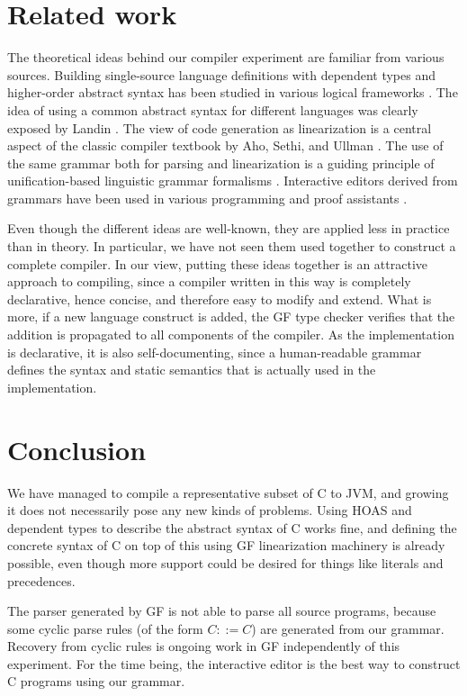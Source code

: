 \documentclass[12pt]{article}
\begin{document}
\section{Related work}

The theoretical ideas behind our compiler experiment
are familiar from various sources.
Building single-source language definitions with
dependent types and higher-order abstract syntax
has been studied in various logical frameworks 
\cite{harper-honsell,magnusson-nordstr,twelf}.
The idea of using a common abstract syntax for different 
languages was clearly exposed by Landin \cite{landin}. The view of
code generation as linearization is a central aspect of
the classic compiler textbook by Aho, Sethi, and Ullman
\cite{aho-ullman}. 
The use of the same grammar both for parsing and linearization
is a guiding principle of unification-based linguistic grammar 
formalisms \cite{pereira-shieber}. Interactive editors derived from
grammars have been used in various programming and proof
assistants \cite{teitelbaum,metal,magnusson-nordstr}.

Even though the different ideas are well-known, they are
applied less in practice than in theory. In particular,
we have not seen them used together to construct a complete
compiler. In our view, putting these ideas together is
an attractive approach to compiling, since a compiler written
in this way is completely declarative, hence concise, 
and therefore easy to modify and extend. What is more, if
a new language construct is added, the GF type checker
verifies that the addition is propagated to all components
of the compiler. As the implementation is declarative, 
it is also self-documenting, since a human-readable 
grammar defines the syntax and static
semantics that is actually used in the implementation.


\section{Conclusion}

We have managed to compile a representative 
subset of C to JVM, and growing it
does not necessarily pose any new kinds of problems. 
Using HOAS and dependent types to describe the abstract
syntax of C works fine, and defining the concrete syntax
of C on top of this using GF linearization machinery is 
already possible, even though more support could be
desired for things like literals and precedences.

The parser generated by GF is not able to parse all
source programs, because some cyclic parse
rules (of the form $C ::= C$) are generated from our grammar. 
Recovery from cyclic rules is ongoing work in GF independently of this
experiment. For the time being, the interactive editor is the best way to
construct C programs using our grammar.
\end{document}
